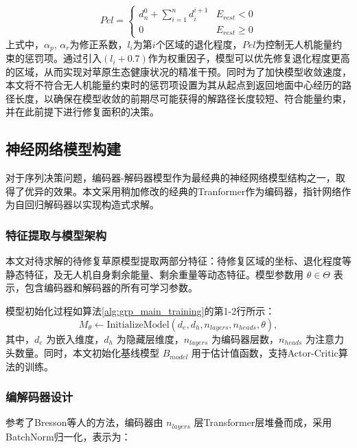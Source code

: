 \documentclass[AutoFakeBold]{LZUThesis}
\begin{document}
\begin{equation}
	Pel=\left\{\begin{array}{ll}
		d_{n}^{0}+\sum\limits_{i=1}^{n}d_{i}^{i+1} & E_{rest}<0     \\
		0                                          & E_{rest}\geq 0
	\end{array}\right. 
	\label{eq:12}
\end{equation}
上式中，$\alpha_p$, $\alpha_r$为修正系数，$l_i$为第$i$个区域的退化程度，$Pel$为控制无人机能量约束的惩罚项。通过引入$(l_i+0.7)$作为权重因子，模型可以优先修复退化程度更高的区域，从而实现对草原生态健康状况的精准干预。同时为了加快模型收敛速度，本文将不符合无人机能量约束时的惩罚项设置为其从起点到返回地面中心经历的路径长度，以确保在模型收敛的前期尽可能获得的解路径长度较短、符合能量约束，并在此前提下进行修复面积的决策。

\subsection{神经网络模型构建}

对于序列决策问题，编码器-解码器模型\cite{vaswani2017attention}作为最经典的神经网络模型结构之一，取得了优异的效果。本文采用稍加修改的经典的Tranformer作为编码器，指针网络\cite{vinyals2015pointer}作为自回归解码器以实现构造式求解。

\subsubsection{特征提取与模型架构}

本文对待求解的待修复草原模型提取两部分特征：待修复区域的坐标、退化程度等静态特征，及无人机自身剩余能量、剩余重量等动态特征。模型参数用 $\theta \in \Theta$ 表示，包含编码器和解码器的所有可学习参数。

模型初始化过程如算法\ref{alg:grp_main_training}的第1-2行所示：
\begin{equation}
	M_{\theta} \leftarrow \text{InitializeModel}(d_e, d_h, n_{layers}, n_{heads}, \theta),
\end{equation}
其中，$d_e$ 为嵌入维度，$d_h$ 为隐藏层维度，$n_{layers}$ 为编码器层数，$n_{heads}$ 为注意力头数量。同时，本文初始化基线模型 $B_{model}$ 用于估计值函数，支持Actor-Critic算法的训练。

\subsubsection{编解码器设计}

参考了Bresson\cite{bresson2021transformer}等人的方法，编码器由 $n_{layers}$ 层Transformer层堆叠而成，采用BatchNorm归一化，表示为：
\end{document}
